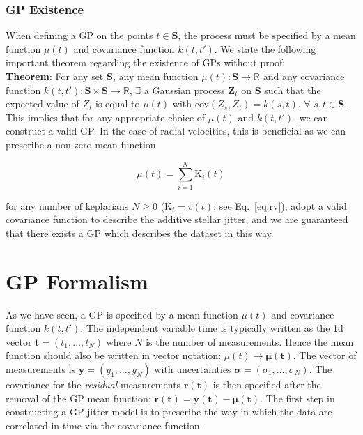 \subsubsection{GP Existence}
When defining a GP on the points $t \in \mathbf{S}$, the process must be 
specified by a mean function $\mu(t)$ 
and covariance function $k(t,t')$. We state the following 
important theorem regarding the existence of GPs without proof: \\

\textbf{Theorem}: 
For any set $\mathbf{S}$, any mean function $\mu(t): \mathbf{S} \to \mathbb{R}$ and 
any covariance function $k(t,t'): \mathbf{S} \times \mathbf{S} \to \mathbb{R}$, 
$\exists$ a Gaussian 
process $\mathbf{Z}_t$ on $\mathbf{S}$ such that the expected value of $Z_t$ is 
equal to $\mu(t)$ with 
cov$(Z_s,Z_t) = k(s,t)$, $\forall \hspace{4pt} s,t \in \mathbf{S}$. \\

This implies that for any appropriate choice of $\mu(t)$ and $k(t,t')$, we can construct 
a valid GP. 
In the case of radial velocities, this is beneficial as we can prescribe a non-zero 
mean function 

\begin{equation}
\mu(t) = \sum_{i=1}^{N} \mathrm{K}_i(t) 
\label{eq:keps}
\end{equation}

\noindent for any number of keplarians $N \ge 0$ (K$_i=v(t)$; see Eq.~\ref{eq:rv}), adopt a 
valid covariance 
function to describe the additive stellar jitter, and we are guaranteed that 
there exists a GP which describes the dataset in this way.

\section{GP Formalism} \label{sect:gpformalism} 
As we have seen, a GP is specified by a mean function $\mu(t)$ and 
covariance function $k(t,t')$. The independent variable time 
is typically written as the 1d vector $\mathbf{t}=(t_1,\dots,t_N)$ where $N$ is the 
number of measurements. Hence the mean function should also be written in vector 
notation: $\mu(t) \to \boldsymbol{\mu}(\mathbf{t})$. 
The vector of measurements is $\mathbf{y}=(y_1,\dots,y_N)$ with 
uncertainties $\boldsymbol{\sigma}=(\sigma_1,\dots,\sigma_N)$. The 
covariance for the \emph{residual} measurements $\mathbf{r}(\mathbf{t})$ is then 
specified after the removal of the GP mean function; 
$\mathbf{r}(\mathbf{t}) = \mathbf{y}(\mathbf{t}) - \boldsymbol{\mu}(\mathbf{t})$. 
The first step in constructing a GP jitter model is to prescribe the way in 
which the data are correlated in time via the covariance function.

